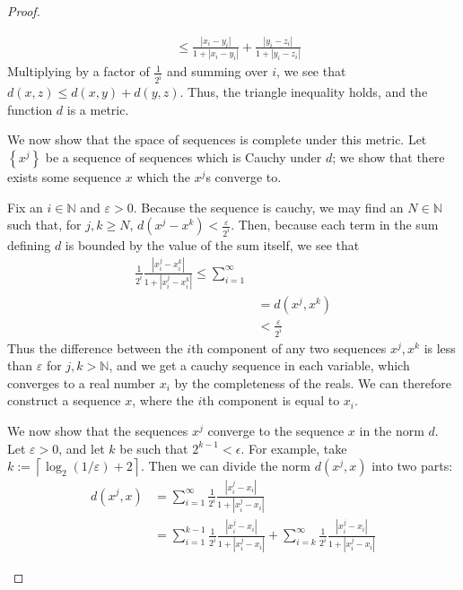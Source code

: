 \documentclass[12pt]{article}
\newcommand{\N}{\mathbb{N}}
\theoremstyle{definition}
\begin{document}
\begin{proof}
\begin{enumerate}[label=(\roman*)]
\begin{itemize}
\begin{align*}
			&\leq \frac{\left \lvert { x_i - y_i } \right \lvert }{1 + \left \lvert { x_i - y_i } \right \lvert } + \frac{\left \lvert { y_i - z_i } \right \lvert }{1 + \left \lvert { y_i - z_i } \right \lvert }
			\end{align*}
			Multiplying by a factor of $\frac{1}{2^i}$ and summing over $i$, we see that $d(x,z) \leq d(x,y) + d(y,z)$. Thus, the triangle inequality holds, and the function $d$ is a metric.
	\end{itemize}
	We now show that the space of sequences is complete under this metric. Let $\left\{ x^j \right\}$ be a sequence of sequences which is Cauchy under $d$; we show that there exists some sequence $x$ which the $x^j$s converge to.
	\par Fix an $i \in \N$ and $\varepsilon > 0$.  Because the sequence is cauchy, we may find an $N \in \N$ such that, for $j, k \geq N$, $d(x^j - x^k) < \frac{\varepsilon}{2^i}$. Then, because each term in the sum defining $d$ is bounded by the value of the sum itself, we see that
	\begin{align*}
		\frac{1}{2^i} \frac{\left \lvert { x^j_i - x^k_i } \right \lvert }{1 + \left \lvert { x^j_i - x^k_i } \right \lvert } \leq \sum_{i= 1}^\infty \\
		&= d(x^j,x^k)\\
		&< \frac{\varepsilon}{2^i}
	\end{align*}
	Thus the difference between the $i$th component of any two sequences $x^j, x^k$ is less than $\varepsilon$ for $j, k > \N$, and we get a cauchy sequence in each variable, which converges to a real number $x_i$ by the completeness of the reals. We can therefore construct a sequence $x$, where the $i$th component is equal to $x_i$. 
	\par We now show that the sequences $x^j$ converge to the sequence $x$ in the norm $d$. Let $\varepsilon > 0$, and let $k$ be such that $2^{k-1} < \epsilon$. For example, take $k := \left \lceil \log_2(1/\varepsilon) + 2 \right \rceil$. Then we can divide the norm $d(x^j, x)$ into two parts:
	\begin{align*}
		d(x^j, x) &= \sum_{i = 1}^\infty \frac{1}{2^i}\frac{\left \lvert { x^j_i - x_i } \right \lvert }{1 + \left \lvert { x^j_i - x_i } \right \lvert }\\
		&= \sum_{i = 1}^{k - 1} \frac{1}{2^i} \frac{\left \lvert { x^j_i - x_i } \right \lvert }{ 1 + \left \lvert { x^j_i - x_i } \right \lvert }+ \sum_{i = k}^\infty \frac{1}{2^i} \frac{\left \lvert { x^j_i - x_i } \right \lvert }{1 + \left \lvert { x^j_i - x_i } \right \lvert }

\end{align*}
\end{enumerate}
\end{proof}
\end{document}
